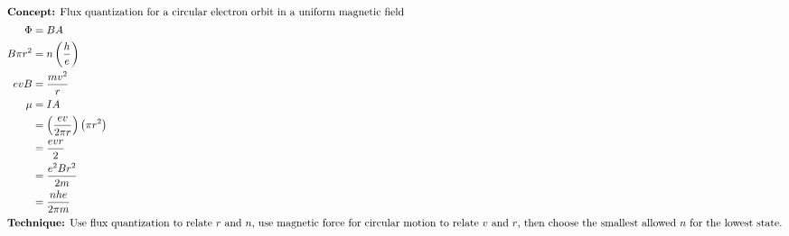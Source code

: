 \begin{idea}
    \begin{align*}
    \intertext{\textbf{Concept:} Flux quantization for a circular electron orbit in a uniform magnetic field}
    \Phi &= BA \\
    B\pi r^2 &= n\left(\frac{h}{e}\right) \\
    evB &= \frac{mv^2}{r} \\
    \mu &= IA \\
    &= \left(\frac{ev}{2\pi r}\right)\left(\pi r^2\right) \\
    &= \frac{evr}{2} \\
    &= \frac{e^2Br^2}{2m} \\
    &= \frac{nhe}{2\pi m} \\
    \intertext{\textbf{Technique:} Use flux quantization to relate $r$ and $n$, use magnetic force for circular motion to relate $v$ and $r$, then choose the smallest allowed $n$ for the lowest state.}
    \end{align*}
\end{idea}
